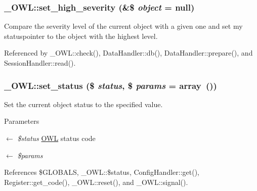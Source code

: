 \subsubsection[{set\_\-high\_\-severity}]{\setlength{\rightskip}{0pt plus 5cm}\_\-OWL::set\_\-high\_\-severity (\&\$ {\em object} = {\ttfamily null})}\label{class__OWL_a576829692a3b66e3d518853bf43abae3}
Compare the severity level of the current object with a given one and set my statuspointer to the object with the highest level. 

Referenced by \_\-OWL::check(), DataHandler::db(), DataHandler::prepare(), and SessionHandler::read().

\subsubsection[{set\_\-status}]{\setlength{\rightskip}{0pt plus 5cm}\_\-OWL::set\_\-status (\$ {\em status}, \/  \$ {\em params} = {\ttfamily array~()})}\label{class__OWL_aea912d0ede9b3c2a69b79072d94d4787}
Set the current object status to the specified value.


\begin{DoxyParams}{Parameters}
\item[\mbox{$\leftarrow$} {\em \$status}]\hyperlink{classOWL}{OWL} status code \item[\mbox{$\leftarrow$} {\em \$params}]\end{DoxyParams}


References \$GLOBALS, \_\-OWL::\$status, ConfigHandler::get(), Register::get\_\-code(), \_\-OWL::reset(), and \_\-OWL::signal().



